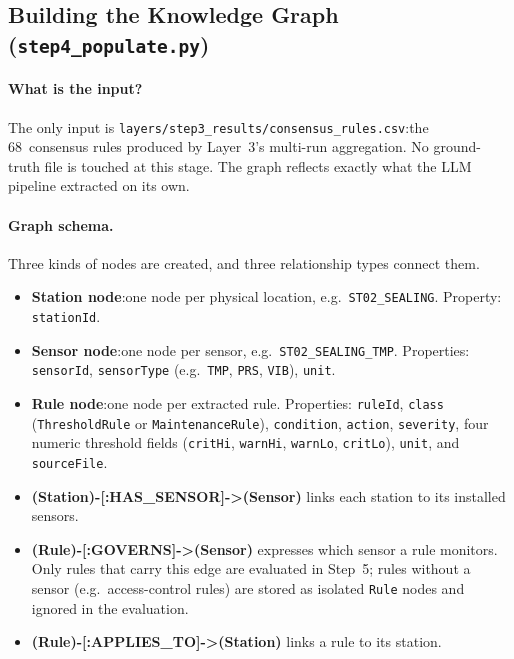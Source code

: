 ﻿\documentclass[11pt]{article}
\begin{document}
\subsection{Building the Knowledge Graph (\texttt{step4\_populate.py})}
\label{sec:step4}

\paragraph{What is the input?}
The only input is \texttt{layers/step3\_results/consensus\_rules.csv}:the
68~consensus rules produced by Layer~3's multi-run aggregation.
No ground-truth file is touched at this stage.
The graph reflects exactly what the LLM pipeline extracted on its own.

\paragraph{Graph schema.}
Three kinds of nodes are created, and three relationship types connect them.

\begin{itemize}
  \item \textbf{Station node}:one node per physical location, e.g.\
        \texttt{ST02\_SEALING}.
        Property: \texttt{stationId}.

  \item \textbf{Sensor node}:one node per sensor, e.g.\
        \texttt{ST02\_SEALING\_TMP}.
        Properties: \texttt{sensorId}, \texttt{sensorType} (e.g.\ \texttt{TMP},
        \texttt{PRS}, \texttt{VIB}), \texttt{unit}.

  \item \textbf{Rule node}:one node per extracted rule.
        Properties: \texttt{ruleId}, \texttt{class}
        (\texttt{ThresholdRule} or \texttt{MaintenanceRule}),
        \texttt{condition}, \texttt{action}, \texttt{severity},
        four numeric threshold fields
        (\texttt{critHi}, \texttt{warnHi}, \texttt{warnLo}, \texttt{critLo}),
        \texttt{unit}, and \texttt{sourceFile}.
\end{itemize}

\begin{itemize}
  \item \textbf{(Station)-[:HAS\_SENSOR]->(Sensor)} links each station to its
        installed sensors.
  \item \textbf{(Rule)-[:GOVERNS]->(Sensor)} expresses which sensor a rule
        monitors.  Only rules that carry this edge are evaluated in Step~5;
        rules without a sensor (e.g.\ access-control rules) are stored as
        isolated \texttt{Rule} nodes and ignored in the evaluation.
  \item \textbf{(Rule)-[:APPLIES\_TO]->(Station)} links a rule to its station.
\end{itemize}
\end{document}
